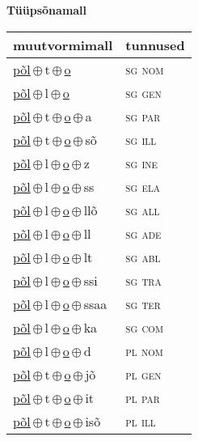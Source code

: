 

\vspace{3.5em}
\noindent \begin{minipage}{\textwidth}
\noindent \textbf{Tüüpsõnamall \,}\\

\begin{sideways}
\begin{tabular}{l l}
muutvormimall & tunnused \\
\hline
\underline{põl}\,$\oplus$\,t\,$\oplus$\,\underline{o} & \textsc{ sg nom } \\
\underline{põl}\,$\oplus$\,l\,$\oplus$\,\underline{o} & \textsc{ sg gen } \\
\underline{põl}\,$\oplus$\,t\,$\oplus$\,\underline{o}\,$\oplus$\,a & \textsc{ sg par } \\
\underline{põl}\,$\oplus$\,t\,$\oplus$\,\underline{o}\,$\oplus$\,sõ & \textsc{ sg ill } \\
\underline{põl}\,$\oplus$\,l\,$\oplus$\,\underline{o}\,$\oplus$\,z & \textsc{ sg ine } \\
\underline{põl}\,$\oplus$\,l\,$\oplus$\,\underline{o}\,$\oplus$\,ss & \textsc{ sg ela } \\
\underline{põl}\,$\oplus$\,l\,$\oplus$\,\underline{o}\,$\oplus$\,llõ & \textsc{ sg all } \\
\underline{põl}\,$\oplus$\,l\,$\oplus$\,\underline{o}\,$\oplus$\,ll & \textsc{ sg ade } \\
\underline{põl}\,$\oplus$\,l\,$\oplus$\,\underline{o}\,$\oplus$\,lt & \textsc{ sg abl } \\
\underline{põl}\,$\oplus$\,l\,$\oplus$\,\underline{o}\,$\oplus$\,ssi & \textsc{ sg tra } \\
\underline{põl}\,$\oplus$\,l\,$\oplus$\,\underline{o}\,$\oplus$\,ssaa & \textsc{ sg ter } \\
\underline{põl}\,$\oplus$\,l\,$\oplus$\,\underline{o}\,$\oplus$\,ka & \textsc{ sg com } \\
\underline{põl}\,$\oplus$\,l\,$\oplus$\,\underline{o}\,$\oplus$\,d & \textsc{ pl nom } \\
\underline{põl}\,$\oplus$\,t\,$\oplus$\,\underline{o}\,$\oplus$\,jõ & \textsc{ pl gen } \\
\underline{põl}\,$\oplus$\,t\,$\oplus$\,\underline{o}\,$\oplus$\,it & \textsc{ pl par } \\
\underline{põl}\,$\oplus$\,t\,$\oplus$\,\underline{o}\,$\oplus$\,isõ & \textsc{ pl ill } \\

\end{tabular}
\end{sideways}
\end{minipage}
